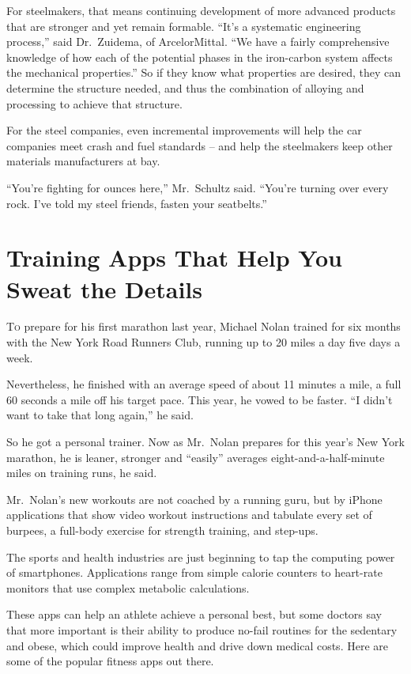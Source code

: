 ﻿\documentclass[12pt]{article}
\begin{document}
For steelmakers, that means continuing development of more advanced products that are stronger and
yet remain formable. ``It's a systematic engineering process,'' said Dr.~Zuidema, of ArcelorMittal.
``We have a fairly comprehensive knowledge of how each of the potential phases in the iron-carbon
system affects the mechanical properties.'' So if they know what properties are desired, they can
determine the structure needed, and thus the combination of alloying and processing to achieve that
structure.

For the steel companies, even incremental improvements will help the car companies meet crash and
fuel standards -- and help the steelmakers keep other materials manufacturers at bay.

``You're fighting for ounces here,'' Mr.~Schultz said. ``You're turning over every rock. I've told
my steel friends, fasten your seatbelts.''

\section{Training Apps That Help You Sweat the Details}

\lettrine{T}{o} prepare for his first marathon last year, Michael Nolan trained for six months with
the New York Road Runners Club, running up to 20 miles a day five days a week.

Nevertheless, he finished with an average speed of about 11 minutes a mile, a full 60 seconds a mile
off his target pace. This year, he vowed to be faster. ``I didn't want to take that long again,'' he
said.

So he got a personal trainer. Now as Mr.~Nolan prepares for this year's New York marathon, he is
leaner, stronger and ``easily'' averages eight-and-a-half-minute miles on training runs, he said.

Mr.~Nolan's new workouts are not coached by a running guru, but by iPhone applications that show
video workout instructions and tabulate every set of burpees, a full-body exercise for strength
training, and step-ups.

The sports and health industries are just beginning to tap the computing power of smartphones.
Applications range from simple calorie counters to heart-rate monitors that use complex metabolic
calculations.

These apps can help an athlete achieve a personal best, but some doctors say that more important is
their ability to produce no-fail routines for the sedentary\cite{sedentary} and obese\cite{obese},
which could improve health and drive down medical costs. Here are some of the popular fitness apps
out there.
\end{document}
